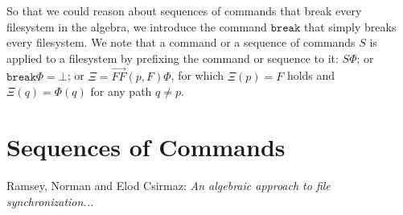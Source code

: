 \documentclass[12pt]{article}
\newcommand{\empt}{\bot}
\newcommand{\FS}{\Phi} %
\newcommand{\cbrk}{\mathtt{break}}
\newcommand{\cff}{\overrightarrow{FF}}
\begin{document}
So that we could reason about sequences of commands that break every filesystem
in the algebra, we introduce the command $\cbrk$ that simply breaks every filesystem.
We note that a command or a sequence of commands $S$ is applied to a filesystem
by prefixing the command or sequence to it:
$S\FS$; or $\cbrk\FS=\empt$; or $\Xi = \cff(p,F)\FS$, for which $\Xi(p)=F$ holds
and $\Xi(q)=\FS(q)$ for any path $q\neq p$.

\section{Sequences of Commands}



\begin{thebibliography}{99}

 Ramsey, Norman and Elod Csirmaz: {\it An algebraic approach to
file synchronization...}

\end{thebibliography}
\end{document}
